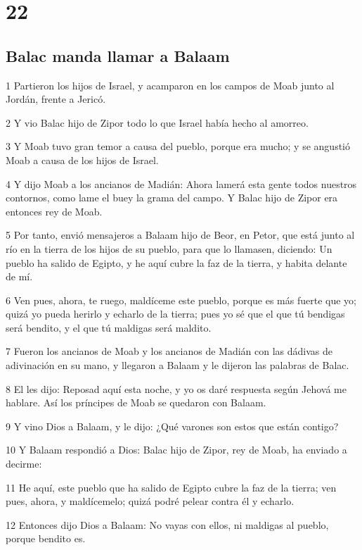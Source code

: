 \chapter{22}

\section*{Balac manda llamar a Balaam}

\par 1 Partieron los hijos de Israel, y acamparon en los campos de Moab junto al Jordán, frente a Jericó. 
\par 2 Y vio Balac hijo de Zipor todo lo que Israel había hecho al amorreo.
\par 3 Y Moab tuvo gran temor a causa del pueblo, porque era mucho; y se angustió Moab a causa de los hijos de Israel.
\par 4 Y dijo Moab a los ancianos de Madián: Ahora lamerá esta gente todos nuestros contornos, como lame el buey la grama del campo. Y Balac hijo de Zipor era entonces rey de Moab. 
\par 5 Por tanto, envió mensajeros a Balaam hijo de Beor, en Petor, que está junto al río en la tierra de los hijos de su pueblo, para que lo llamasen, diciendo: Un pueblo ha salido de Egipto, y he aquí cubre la faz de la tierra, y habita delante de mí.
\par 6 Ven pues, ahora, te ruego, maldíceme este pueblo, porque es más fuerte que yo; quizá yo pueda herirlo y echarlo de la tierra; pues yo sé que el que tú bendigas será bendito, y el que tú maldigas será maldito.
\par 7 Fueron los ancianos de Moab y los ancianos de Madián con las dádivas de adivinación en su mano, y llegaron a Balaam y le dijeron las palabras de Balac.
\par 8 El les dijo: Reposad aquí esta noche, y yo os daré respuesta según Jehová me hablare. Así los príncipes de Moab se quedaron con Balaam.
\par 9 Y vino Dios a Balaam, y le dijo: ¿Qué varones son estos que están contigo?
\par 10 Y Balaam respondió a Dios: Balac hijo de Zipor, rey de Moab, ha enviado a decirme:
\par 11 He aquí, este pueblo que ha salido de Egipto cubre la faz de la tierra; ven pues, ahora, y maldícemelo; quizá podré pelear contra él y echarlo.
\par 12 Entonces dijo Dios a Balaam: No vayas con ellos, ni maldigas al pueblo, porque bendito es.
